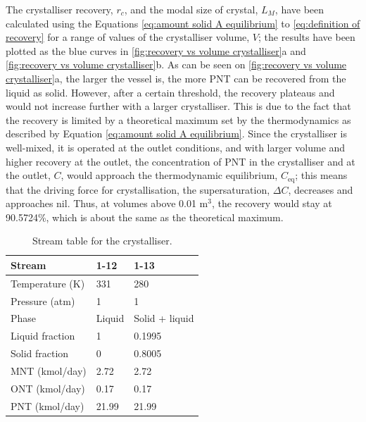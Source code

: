 \noindent The crystalliser recovery, $r_c$, and the modal size of crystal, $L_M$, have been calculated using the Equations \ref{eq:amount solid A equilibrium} to \ref{eq:definition of recovery} for a range of values of the crystalliser volume, $V$; the results have been plotted as the blue curves in \cref{fig:recovery vs volume crystalliser}a and \cref{fig:recovery vs volume crystalliser}b. As can be seen on \cref{fig:recovery vs volume crystalliser}a, the larger the vessel is, the more PNT can be recovered from the liquid as solid. However, after a certain threshold, the recovery plateaus and would not increase further with a larger crystalliser. This is due to the fact that the recovery is limited by a theoretical maximum set by the thermodynamics as described by Equation \ref{eq:amount solid A equilibrium}. Since the crystalliser is well-mixed, it is operated at the outlet conditions, and with larger volume and higher recovery at the outlet, the concentration of PNT in the crystalliser and at the outlet, $C$, would approach the thermodynamic equilibrium, $C_{\mathrm{eq}}$; this means that the driving force for crystallisation, the supersaturation, $\Delta C$, decreases and approaches nil. Thus, at volumes above 0.01 m$^{3}$, the recovery would stay at 90.5724\%, which is about the same as the theoretical maximum.

\begin{table}
\centering
\caption{Stream table for the crystalliser.}
\label{tab:crystalliser stream table}
\begin{tabular}{@{}l|l|l@{}}
\toprule
Stream                  &    1-12  &  1-13 \\ \midrule
Temperature (K)   &    331      & 280 \\ \midrule
Pressure (atm)   &      1    &  1 \\ \midrule
Phase               &   Liquid    & Solid + liquid \\ \midrule
Liquid fraction       &   1       & 0.1995 \\ \midrule
Solid fraction         &  0        & 0.8005 \\ \midrule
MNT (kmol/day)          &  2.72        & 2.72 \\ \midrule
ONT (kmol/day)        &    0.17      & 0.17 \\ \midrule
PNT (kmol/day)          &    21.99      & 21.99 \\ \bottomrule
\end{tabular}
\end{table}

